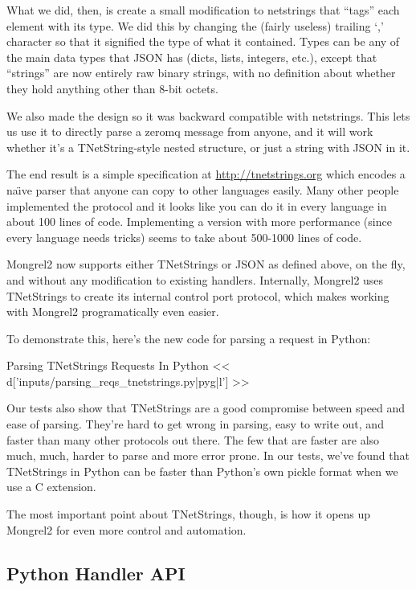 What we did, then, is create a small modification to netstrings that ``tags''
each element with its type.  We did this by changing the (fairly useless)
trailing `,' character so that it signified the type of what it contained.
Types can be any of the main data types that JSON has (dicts, lists, integers, etc.),
except that ``strings'' are now entirely raw binary strings, with no
definition about whether they hold anything other than 8-bit octets.

We also made the design so it was backward compatible with netstrings.
This lets us use it to directly parse a zeromq message from anyone, and
it will work whether it's a TNetString-style nested structure, or just
a string with JSON in it.

The end result is a simple specification at \href{http://tnetstrings.org}{http://tnetstrings.org}
which encodes a na\"{\i}ve parser that anyone can copy to other languages easily.
Many other people implemented the protocol and it looks like you can do
it in every language in about 100 lines of code.  Implementing a version
with more performance (since every language needs tricks) seems to take
about 500-1000 lines of code.

Mongrel2 now supports either TNetStrings or JSON as defined above, on the
fly, and without any modification to existing handlers.  Internally, Mongrel2
uses TNetStrings to create its internal control port protocol, which makes
working with Mongrel2 programatically even easier.

To demonstrate this, here's the new code for parsing a request in Python:


\begin{code}{Parsing TNetStrings Requests In Python}
<< d['inputs/parsing_reqs_tnetstrings.py|pyg|l'] >>
\end{code}

Our tests also show that TNetStrings are a good compromise between
speed and ease of parsing.  They're hard to get wrong in parsing, easy
to write out, and faster than many other protocols out there.  The few
that are faster are also much, much, harder to parse and more error
prone.  In our tests, we've found that TNetStrings in Python can be
faster than Python's own pickle format when we use a C extension.

The most important point about TNetStrings, though, is how it opens up
Mongrel2 for even more control and automation.

\subsection{Python Handler API}

